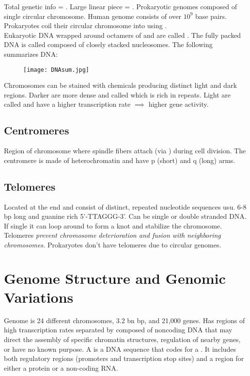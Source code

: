 \documentclass[../Bio_chemistryReview.tex]{subfiles}
\begin{document}
Total genetic info = . Large linear piece = .
Prokaryotic genomes composed of single circular chromosome. Human genome
consists of over $ 10^{9} $ base pairs. Prokaryotes coil their circular
chromosome into  using .\\
Eukaryotic DNA wrapped around octamers of  and are called
. The fully packed DNA is called  composed
of closely stacked nucleosomes. The following summarizes DNA:

\begin{figure}[h]
  \centering
  \texttt{[image: DNAsum.jpg]}
\end{figure}

Chromosomes can be stained with chemicals producing distinct light and dark
regions. Darker are more dense and called  which is rich
in repeats. Light are called  and have a higher
transcription rate $ \implies $ higher gene activity.

\subsection{Centromeres}

Region of chromosome where spindle fibers attach (via )
during cell division. The centromere is made of heterochromatin and have p
(short) and q (long) arms.

\subsection{Telomeres}

Located at the end and consist of distinct, repeated nucleotide sequences usu.
6-8 bp long and guanine rich 5'-TTAGGG-3'. Can be single or double stranded DNA.
If single it can loop around to form a knot and stabilize the chromosome.
Telomeres \emph{prevent chromosome deterioration and fusion with neighboring
chromosomes.} Prokaryotes don't have telomeres due to circular genomes.

\section{Genome Structure and Genomic Variations}

Genome is 24 different chromosomes, 3.2 bn bp, and 21,000 genes. Has regions of
high transcription rates separated by  composed of
noncoding DNA that may direct the assembly of specific chromatin structures,
regulation of nearby genes, or have no known purpose. A  is a DNA
sequence that codes for a . It includes both regulatory
regions (promoters and transcription stop sites) and a region for either a
protein or a non-coding RNA.
\end{document}
